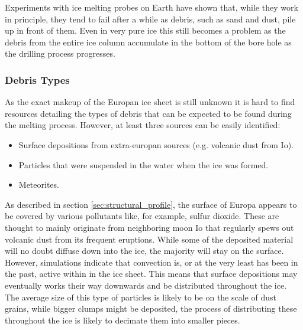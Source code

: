 Experiments with ice melting probes on Earth have shown that, while they work in principle, they tend to fail after a while as debris, such as sand and dust, pile up in front of them\cite{article:di1998a}. Even in very pure ice this still becomes a problem as the debris from the entire ice column accumulate in the bottom of the bore hole as the drilling process progresses. 

\subsubsection{Debris Types}
As the exact makeup of the Europan ice sheet is still unknown it is hard to find resources detailing the types of debris that can be expected to be found during the melting process. However, at least three sources can be easily identified:\\

\begin{itemize}
	\item Surface depositions from extra-europan sources (e.g. volcanic dust from Io).
	\item Particles that were suspended in the water when the ice was formed.
	\item Meteorites.
\end{itemize}

\noindent
As described in section \ref{sec:structural_profile}, the surface of Europa appears to be covered by various pollutants like, for example, sulfur dioxide. These are thought to mainly originate from neighboring moon Io that regularly spews out volcanic dust from its frequent eruptions. While some of the deposited material will no doubt diffuse down into the ice, the majority will stay on the surface. However, simulations indicate that convection is, or at the very least has been in the past, active within in the ice sheet\cite{article:barr2014a}. This means that surface depositions may eventually works their way downwards and be distributed throughout the ice. The average size of this type of particles is likely to be on the scale of dust grains, while bigger clumps might be deposited, the process of distributing these throughout the ice is likely to decimate them into smaller pieces. \\

